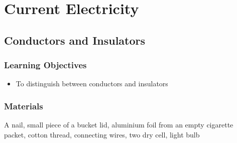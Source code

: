 \section{Current Electricity}




\subsection{Conductors and Insulators}

\subsubsection*{Learning Objectives}
\begin{itemize}
\item{To distinguish between conductors and insulators} 
\end{itemize}

\subsubsection*{Materials}
A nail, small piece of a bucket lid, aluminium foil from an empty cigarette packet, cotton thread, connecting wires, two dry cell, light bulb


